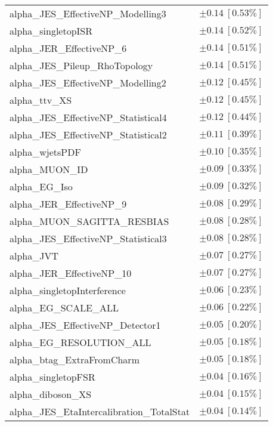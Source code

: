 \begin{table}
\begin{center}
\begin{tabular*}{\textwidth}{@{\extracolsep{\fill}}lc}
alpha\_JES\_EffectiveNP\_Modelling3         & $\pm 0.14\ [0.53\%] $       \\
alpha\_singletopISR         & $\pm 0.14\ [0.52\%] $       \\
alpha\_JER\_EffectiveNP\_6         & $\pm 0.14\ [0.51\%] $       \\
alpha\_JES\_Pileup\_RhoTopology         & $\pm 0.14\ [0.51\%] $       \\
alpha\_JES\_EffectiveNP\_Modelling2         & $\pm 0.12\ [0.45\%] $       \\
alpha\_ttv\_XS         & $\pm 0.12\ [0.45\%] $       \\
alpha\_JES\_EffectiveNP\_Statistical4         & $\pm 0.12\ [0.44\%] $       \\
alpha\_JES\_EffectiveNP\_Statistical2         & $\pm 0.11\ [0.39\%] $       \\
alpha\_wjetsPDF         & $\pm 0.10\ [0.35\%] $       \\
alpha\_MUON\_ID         & $\pm 0.09\ [0.33\%] $       \\
alpha\_EG\_Iso         & $\pm 0.09\ [0.32\%] $       \\
alpha\_JER\_EffectiveNP\_9         & $\pm 0.08\ [0.29\%] $       \\
alpha\_MUON\_SAGITTA\_RESBIAS         & $\pm 0.08\ [0.28\%] $       \\
alpha\_JES\_EffectiveNP\_Statistical3         & $\pm 0.08\ [0.28\%] $       \\
alpha\_JVT         & $\pm 0.07\ [0.27\%] $       \\
alpha\_JER\_EffectiveNP\_10         & $\pm 0.07\ [0.27\%] $       \\
alpha\_singletopInterference         & $\pm 0.06\ [0.23\%] $       \\
alpha\_EG\_SCALE\_ALL         & $\pm 0.06\ [0.22\%] $       \\
alpha\_JES\_EffectiveNP\_Detector1         & $\pm 0.05\ [0.20\%] $       \\
alpha\_EG\_RESOLUTION\_ALL         & $\pm 0.05\ [0.18\%] $       \\
alpha\_btag\_ExtraFromCharm         & $\pm 0.05\ [0.18\%] $       \\
alpha\_singletopFSR         & $\pm 0.04\ [0.16\%] $       \\
alpha\_diboson\_XS         & $\pm 0.04\ [0.15\%] $       \\
alpha\_JES\_EtaIntercalibration\_TotalStat         & $\pm 0.04\ [0.14\%] $       \\

\end{tabular*}
\end{center}
\end{table}
